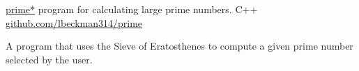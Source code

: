 \showoff
{\href{https://liambeckman.com/code/prime}{prime*}}
{program for calculating large prime numbers.}
{C++}
{\href{https://github.com/lbeckman314/prime}{github.com/lbeckman314/prime}}

A program that uses the Sieve of Eratosthenes to compute a given prime number selected by the user.

\myBreak
